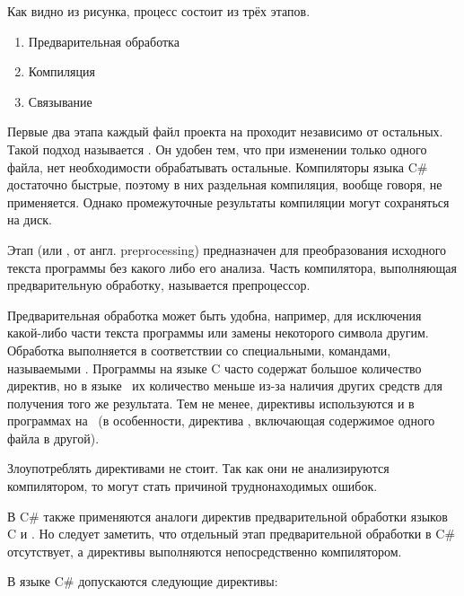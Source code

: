 Как видно из рисунка, процесс состоит из трёх этапов.

\begin{enumerate}
\item Предварительная обработка
\item Компиляция
\item Связывание
\end{enumerate}

Первые два этапа каждый файл проекта на \CPP проходит независимо от
остальных.  Такой подход называется
. Он удобен тем,
что при изменении только одного файла, нет необходимости обрабатывать
остальные.  Компиляторы языка C\# достаточно быстрые, поэтому в них
раздельная компиляция, вообще говоря, не применяется. Однако
промежуточные результаты компиляции могут сохраняться на диск.


Этап  (или
, от англ. preprocessing)
предназначен для преобразования исходного текста программы без какого
либо его анализа. Часть компилятора, выполняющая предварительную
обработку, называется препроцессор.

Предварительная обработка может быть удобна, например, для исключения
какой-либо части текста программы или замены некоторого символа
другим.  Обработка выполняется в соответствии со специальными,
командами, называемыми . Программы на языке C часто содержат большое
количество директив, но в языке \CPP\ их количество меньше из-за наличия
других средств для получения того же результата. Тем не менее,
директивы используются и в программах на \CPP\ (в особенности, директива
, включающая содержимое одного файла в другой).

Злоупотреблять директивами не стоит. Так как они не анализируются
компилятором, то могут стать причиной труднонаходимых ошибок.

В C\# также применяются аналоги директив предварительной обработки
языков C и \CPP. Но следует заметить, что отдельный этап
предварительной обработки в C\# отсутствует, а директивы выполняются
непосредственно компилятором.

В языке C\# допускаются следующие директивы:

